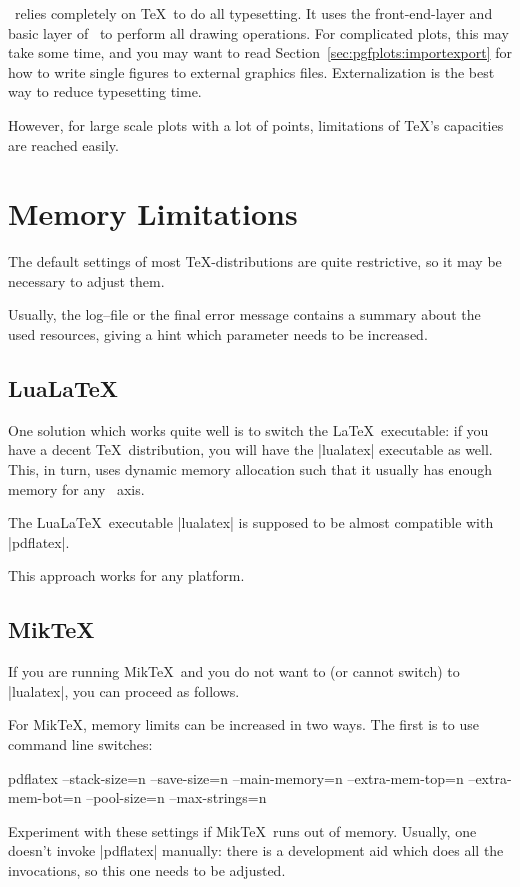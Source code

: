 {\PGFPlots\ relies completely on \TeX\ to do all typesetting. It uses the front-end-layer and basic layer of \PGF\ to perform all drawing operations. For complicated plots, this may take some time, and you may want to read Section~\ref{sec:pgfplots:importexport} for how to write single figures to external graphics files. Externalization is the best way to reduce typesetting time.

However, for large scale plots with a lot of points, limitations of \TeX's capacities are reached easily.

\section{Memory Limitations}
The default settings of most \TeX-distributions are quite restrictive, so it may be necessary to adjust them.

Usually, the log--file or the final error message contains a summary about the used resources, giving a hint which parameter needs to be increased.

\subsection{LuaLa\TeX}
One solution which works quite well is to switch the La\TeX\ executable: if you have a decent \TeX\ distribution, you will have the |lualatex| executable as well. This, in turn, uses dynamic memory allocation such that it usually has enough memory for any \PGFPlots\ axis.

The LuaLa\TeX\ executable |lualatex| is supposed to be almost compatible with |pdflatex|.

This approach works for any platform.

\subsection{Mik\TeX}
If you are running Mik\TeX\ and you do not want to (or cannot switch) to |lualatex|, you can proceed as follows.

For Mik\TeX, memory limits can be increased in two ways. The first is to use command line switches:
\begin{codeexample}
pdflatex
	--stack-size=n --save-size=n
	--main-memory=n --extra-mem-top=n --extra-mem-bot=n
	--pool-size=n --max-strings=n
\end{codeexample}
\noindent Experiment with these settings if Mik\TeX\ runs out of memory. Usually, one doesn't invoke |pdflatex| manually: there is a development aid which does all the invocations, so this one needs to be adjusted.

}
